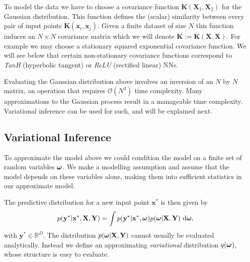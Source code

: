 \documentclass{article} %
\def\Tr{\text{Tr}}
\newcommand{\R}{\mathbb{R}}
\newcommand{\td}{\text{d}}
\newcommand{\x}{\mathbf{x}}
\newcommand{\y}{\mathbf{y}}
\newcommand{\X}{\mathbf{X}}
\newcommand{\Y}{\mathbf{Y}}
\newcommand{\bo}{\text{\boldmath$\omega$}}
\newcommand{\K}{\mathbf{K}}
\theoremstyle{definition}
\begin{document}
To model the data we have to choose a covariance function $\K(\X_1, \X_2)$ for the Gaussian distribution. This function defines the (scalar) similarity between every pair of input points $\K(\mathbf{x}_i, \mathbf{x}_j)$. Given a finite dataset of size $N$ this function induces an $N \times N$ covariance matrix which we will denote $\K := \K(\X, \X)$. For example we may choose a stationary squared exponential covariance function. We will see below that certain non-stationary covariance functions correspond to \textit{TanH} (hyperbolic tangent) or \textit{ReLU} (rectified linear) NNs. 


Evaluating the Gaussian distribution above involves an inversion of an $N$ by $N$ matrix, an operation that requires $\mathcal{O}(N^3)$ time complexity. Many approximations to the Gaussian process result in a manageable time complexity. 
Variational inference can be used for such, and will be explained next.



\subsection{Variational Inference}

To approximate the model above we could condition the model on a finite set of random variables $\bo$. We make a modelling assumption and assume that the model depends on these variables alone, making them into sufficient statistics in our approximate model.

The predictive distribution for a new input point $\x^*$ is then given by 
$$
p(\y^* | \x^*, \X, \Y) = \int p(\y^* | \x^*, \bo) p(\bo | \X, \Y)\ \td \bo,
$$
with $\y^* \in \R^{D}$.
The distribution $p(\bo | \X, \Y)$ cannot usually be evaluated analytically. Instead we define an approximating \textit{variational} distribution $q(\bo)$, whose structure is easy to evaluate.
\end{document}
